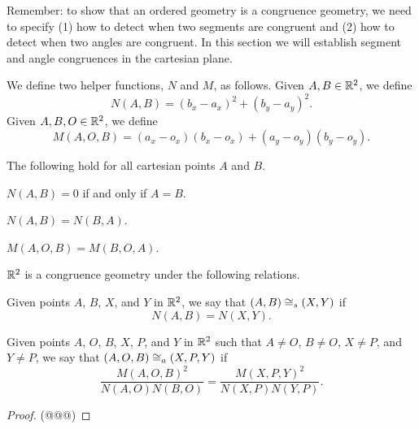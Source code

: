 Remember: to show that an ordered geometry is a congruence geometry, we need to specify (1) how to detect when two segments are congruent and (2) how to detect when two angles are congruent.
In this section we will establish segment and angle congruences in the cartesian plane.

We define two helper functions, \(N\) and \(M\), as follows.
Given \(A,B \in \mathbb{R}^2\), we define \[ N(A,B) = (b_x - a_x)^2 + (b_y - a_y)^2. \]
Given \(A,B,O \in \mathbb{R}^2\), we define \[ M(A,O,B) = (a_x - o_x)(b_x - o_x) + (a_y - o_y)(b_y - o_y). \]

\begin{prop}
The following hold for all cartesian points \(A\) and \(B\).
\begin{proplist}
\item \(N(A,B) = 0\) if and only if \(A = B\).
\item \(N(A,B) = N(B,A)\).
\item \(M(A,O,B) = M(B,O,A)\).
\end{proplist}
\end{prop}

\begin{prop}
\(\mathbb{R}^2\) is a congruence geometry under the following relations.
\begin{proplist}
\item Given points \(A\), \(B\), \(X\), and \(Y\) in \(\mathbb{R}^2\), we say that \((A,B) \cong_s (X,Y)\) if \[ N(A,B) = N(X,Y). \]
\item Given points \(A\), \(O\), \(B\), \(X\), \(P\), and \(Y\) in \(\mathbb{R}^2\) such that \(A \neq O\), \(B \neq O\), \(X \neq P\), and \(Y \neq P\), we say that \((A,O,B) \cong_a (X,P,Y)\) if \[ \frac{M(A,O,B)^2}{N(A,O)N(B,O)} = \frac{M(X,P,Y)^2}{N(X,P)N(Y,P)}. \]
\end{proplist}
\end{prop}

\begin{proof}
(@@@)
\end{proof}
